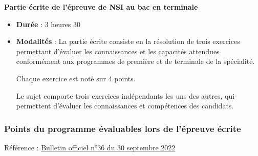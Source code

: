 \documentclass[
  letterpaper,
  DIV=11,
  numbers=noendperiod]{scrartcl}
\begin{document}
\textbf{Partie écrite de l'épreuve de NSI au bac en terminale}

\begin{itemize}
\item
  \textbf{Durée} : 3 heures 30
\item
  \textbf{Modalités} : La partie écrite consiste en la résolution de
  trois exercices permettant d'évaluer les connaissances et les
  capacités attendues conformément aux programmes de première et de
  terminale de la spécialité.

  Chaque exercice est noté sur 4 points.

  Le sujet comporte trois exercices indépendants les uns des autres, qui
  permettent d'évaluer les connaissances et compétences des candidats.
\end{itemize}

\hypertarget{points-du-programme-uxe9valuables-lors-de-luxe9preuve-uxe9crite}{%
\subsubsection{Points du programme évaluables lors de l'épreuve
écrite}\label{points-du-programme-uxe9valuables-lors-de-luxe9preuve-uxe9crite}}

Référence :
\href{https://www.education.gouv.fr/bo/22/Hebdo36/MENE2227884N.htm}{Bulletin
officiel n°36 du 30 septembre 2022}
\end{document}
